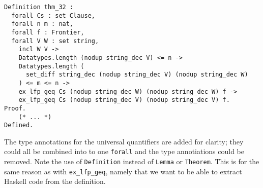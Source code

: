 \begin{minipage}{\linewidth}
\begin{lstlisting}[language=Coq, label={lst:thm_32}, caption={Theorem 3.2 in Coq}]
Definition thm_32 :
  forall Cs : set Clause,
  forall n m : nat,
  forall f : Frontier,
  forall V W : set string,
    incl W V ->
    Datatypes.length (nodup string_dec V) <= n ->
    Datatypes.length (
      set_diff string_dec (nodup string_dec V) (nodup string_dec W)
    ) <= m <= n ->
    ex_lfp_geq Cs (nodup string_dec W) (nodup string_dec W) f ->
    ex_lfp_geq Cs (nodup string_dec V) (nodup string_dec V) f.
Proof.
    (* ... *)
Defined.
\end{lstlisting}
\end{minipage}

The type annotations for the universal quantifiers are added for clarity; they could all be combined
into to one \lstinline{forall} and the type annotiations could be removed.
Note the use of \lstinline{Definition} instead of \lstinline{Lemma} or \lstinline{Theorem}.
This is for the same reason as with \lstinline{ex_lfp_geq}, namely that we want to be able to extract
Haskell code from the definition.
